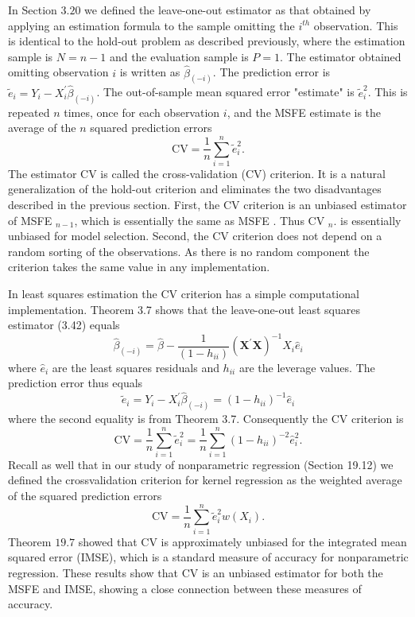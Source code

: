 \documentclass[10pt]{article}
\begin{document}
In Section $3.20$ we defined the leave-one-out estimator as that obtained by applying an estimation formula to the sample omitting the $i^{t h}$ observation. This is identical to the hold-out problem as described previously, where the estimation sample is $N=n-1$ and the evaluation sample is $P=1$. The estimator obtained omitting observation $i$ is written as $\widehat{\beta}_{(-i)}$. The prediction error is $\widetilde{e}_{i}=Y_{i}-X_{i}^{\prime} \widehat{\beta}_{(-i)}$. The out-of-sample mean squared error "estimate" is $\widetilde{e}_{i}^{2}$. This is repeated $n$ times, once for each observation $i$, and the MSFE estimate is the average of the $n$ squared prediction errors
$$
\mathrm{CV}=\frac{1}{n} \sum_{i=1}^{n} \widetilde{e}_{i}^{2} .
$$
The estimator CV is called the cross-validation (CV) criterion. It is a natural generalization of the hold-out criterion and eliminates the two disadvantages described in the previous section. First, the CV criterion is an unbiased estimator of MSFE ${ }_{n-1}$, which is essentially the same as MSFE . Thus CV $_{n}$. is essentially unbiased for model selection. Second, the CV criterion does not depend on a random sorting of the observations. As there is no random component the criterion takes the same value in any implementation.

In least squares estimation the CV criterion has a simple computational implementation. Theorem 3.7 shows that the leave-one-out least squares estimator (3.42) equals
$$
\widehat{\beta}_{(-i)}=\widehat{\beta}-\frac{1}{\left(1-h_{i i}\right)}\left(\boldsymbol{X}^{\prime} \boldsymbol{X}\right)^{-1} X_{i} \widehat{e}_{i}
$$
where $\widehat{e}_{i}$ are the least squares residuals and $h_{i i}$ are the leverage values. The prediction error thus equals
$$
\widetilde{e}_{i}=Y_{i}-X_{i}^{\prime} \widehat{\beta}_{(-i)}=\left(1-h_{i i}\right)^{-1} \widehat{e}_{i}
$$
where the second equality is from Theorem 3.7. Consequently the CV criterion is
$$
\mathrm{CV}=\frac{1}{n} \sum_{i=1}^{n} \widetilde{e}_{i}^{2}=\frac{1}{n} \sum_{i=1}^{n}\left(1-h_{i i}\right)^{-2} \widehat{e}_{i}^{2} .
$$
Recall as well that in our study of nonparametric regression (Section 19.12) we defined the crossvalidation criterion for kernel regression as the weighted average of the squared prediction errors
$$
\mathrm{CV}=\frac{1}{n} \sum_{i=1}^{n} \tilde{e}_{i}^{2} w\left(X_{i}\right) .
$$
Theorem $19.7$ showed that $\mathrm{CV}$ is approximately unbiased for the integrated mean squared error (IMSE), which is a standard measure of accuracy for nonparametric regression. These results show that CV is an unbiased estimator for both the MSFE and IMSE, showing a close connection between these measures of accuracy.
\end{document}
